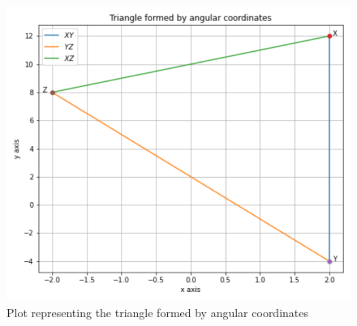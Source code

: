 \documentclass[journal,12pt]{IEEEtran}
\begin{document}
\begin{figure}[h]
	\centering
	\includegraphics[scale=0.4]{Triangle_Fig.png}
	\caption{Plot representing the triangle formed by angular coordinates}
\end{figure}
\end{document}
